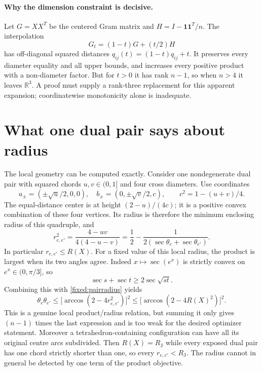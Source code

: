 \documentclass[11pt]{article}
\theoremstyle{remark}\newtheorem{remark}[theorem]{Remark}
\newcommand{\R}{\mathbb R}
\newcommand{\RJ}{R_{\mathrm J}}
\begin{document}
\paragraph{Why the dimension constraint is decisive.}
Let $G=XX^T$ be the centered Gram matrix and
$H=I-\mathbf1\mathbf1^T/n$. The interpolation
\[
 G_t=(1-t)G+(t/2)H
\]
has off-diagonal squared distances
$q_{ij}(t)=(1-t)q_{ij}+t$. It preserves every diameter equality and
all upper bounds, and increases every positive product with a
non-diameter factor. But for $t>0$ it has rank $n-1$, so when $n>4$
it leaves $\R^3$. A proof must supply a rank-three replacement for
this apparent expansion; coordinatewise monotonicity alone is inadequate.

\section{What one dual pair says about radius}
The local geometry can be computed exactly. Consider one nondegenerate
dual pair with squared chords $u,v\in(0,1]$ and four cross diameters.
Use coordinates
\[
 a_\pm=(\pm\sqrt u/2,0,0),\quad
 b_\pm=(0,\pm\sqrt v/2,c),\qquad
 c^2=1-(u+v)/4.
\]
The equal-distance center is at height $(2-u)/(4c)$; it is a positive
convex combination of these four vertices. Its radius is therefore the
minimum enclosing radius of this quadruple, and
\begin{equation}\label{fixed:pairradius}
 r_{e,e'}^2=\frac{4-uv}{4(4-u-v)}
 =\frac12-\frac1{2(\sec\theta_e+\sec\theta_{e'})}.
\end{equation}
In particular $r_{e,e'}\leq R(X)$. For a fixed value of this local
radius, the product is largest when its two angles agree. Indeed
$x\mapsto\sec(e^x)$ is strictly convex on $e^x\in(0,\pi/3]$, so
\[
 \sec s+\sec t\geq2\sec\sqrt{st}.
\]
Combining this with \eqref{fixed:pairradius} yields
\[
 \theta_e\theta_{e'}\leq
 \bigl[\arccos(2-4r_{e,e'}^2)\bigr]^2
 \leq\bigl[\arccos(2-4R(X)^2)\bigr]^2.
\]
This is a genuine local product/radius relation, but summing it only
gives $(n-1)$ times the last expression and is too weak for the desired
optimizer statement. Moreover a tetrahedron-containing configuration
can have all its original centre arcs subdivided. Then $R(X)=\RJ$
while every exposed dual pair has one chord strictly shorter than one,
so every $r_{e,e'}<\RJ$. The radius cannot in general be detected by
one term of the product objective.
\end{document}
